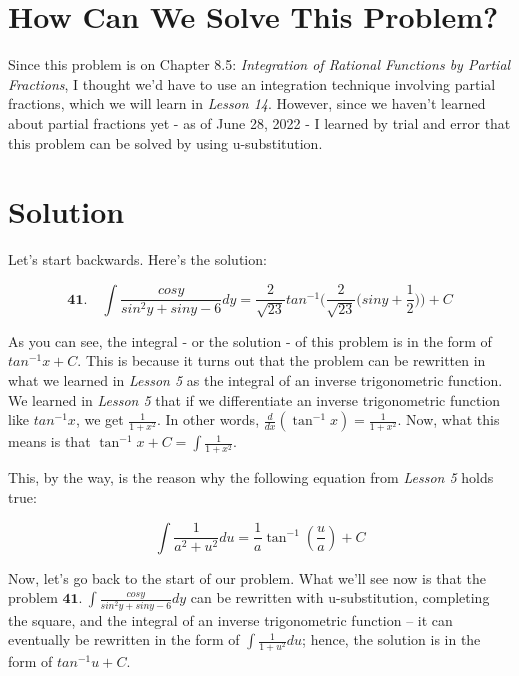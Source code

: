 
\section*{How Can We Solve This Problem?}

Since this problem is on Chapter 8.5: 
\textit{Integration of Rational Functions
by Partial Fractions}, I thought we'd
have to use an integration technique
involving partial fractions, which we will
learn in \textit{Lesson 14}. However,
since we haven't learned about partial fractions
yet - as of June 28, 2022 - I learned
by trial and error that this problem can be 
solved by using u-substitution.

\section*{Solution}
 
Let's start backwards. Here's the solution:

\begin{equation*}
\textbf{41.}\quad \int \frac{cosy}{sin^2y+siny-6} dy =	
	\frac{2}{\sqrt{23}} tan^{-1}\bigg(
		\frac{2}{\sqrt{23}}\big(
			siny+\frac{1}{2}
		\big)
	\bigg) + C
\end{equation*}

As you can see, the integral - or the solution - of 
this problem is in the form of $ tan^{-1}x + C $. 
This is because it turns out that the problem can be 
rewritten in what we learned in \textit{Lesson 5} 
as the integral of an inverse trigonometric function. 
We learned in \textit{Lesson 5} that if we differentiate
an inverse trigonometric function like $ tan^{-1}x $,
we get $ \frac{1}{1+x^2} $. In other words,
$ \frac{d}{dx}\left( \tan^{-1}x \right) = \frac{1}{1+x^2} $.
Now, what this means is that $ \tan^{-1}x + C = 
\int \frac{1}{1+x^2} $. 

This, by the way, is the reason why 
the following equation
from \textit{Lesson 5} holds true:

\begin{equation*}
\int \frac{1}{a^2+u^2} du = 
	\frac{1}{a}\tan^{-1}(\frac{u}{a}) + C
\end{equation*}

Now, let's go back to the start of our problem. 
What we'll see now is that the problem
$\textbf{41.}\ \int \frac{cosy}{sin^2y+siny-6} dy $
can be rewritten with u-substitution, completing
the square, and the integral of an
inverse trigonometric function -- it can 
eventually be rewritten in the form of 
$ \int \frac{1}{1+u^2} du $; hence, the solution is in the
form of $ tan^{-1}u + C $.
	 
